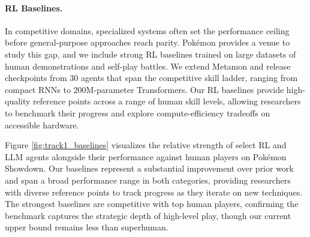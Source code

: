 \paragraph{RL Baselines.} In competitive domains, specialized systems often set the performance ceiling before general-purpose approaches reach parity. Pokémon provides a venue to study this gap, and we include strong RL baselines trained on large datasets of human demonstrations and self-play battles. We extend Metamon \cite{grigsby2025human} and release checkpoints from 30 agents that span the competitive skill ladder, ranging from compact RNNs to 200M-parameter Transformers. Our RL baselines provide high-quality reference points across a range of human skill levels, allowing researchers to benchmark their progress and explore compute-efficiency tradeoffs on accessible hardware.



Figure \ref{fig:track1_baselines} visualizes the relative strength of select RL and LLM agents alongside their performance against human players on Pokémon Showdown. Our baselines represent a substantial improvement over prior work \cite{karten2025pok, grigsby2025human} and span a broad performance range in both categories, providing researchers with diverse reference points to track progress as they iterate on new techniques. The strongest baselines are competitive with top human players, confirming the benchmark captures the strategic depth of high-level play, though our current upper bound remains less than superhuman.